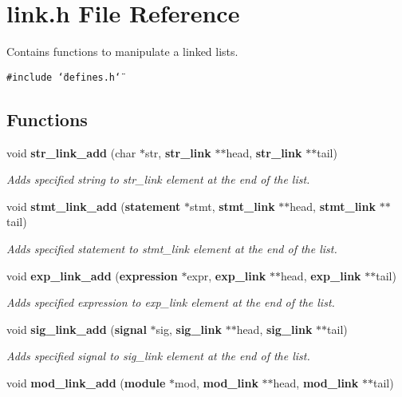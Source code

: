 \section{link.h File Reference}
\label{link_8h}
Contains functions to manipulate a linked lists. 


{\tt \#include \char`\"{}defines.h\char`\"{}}\par
\subsection*{Functions}
\begin{CompactItemize}
\item 
void {\bf str\_\-link\_\-add} (char $\ast$str, {\bf str\_\-link} $\ast$$\ast$head, {\bf str\_\-link} $\ast$$\ast$tail)
\begin{CompactList}\small\item\em Adds specified string to str\_\-link element at the end of the list.\item\end{CompactList}\item 
void {\bf stmt\_\-link\_\-add} ({\bf statement} $\ast$stmt, {\bf stmt\_\-link} $\ast$$\ast$head, {\bf stmt\_\-link} $\ast$$\ast$tail)
\begin{CompactList}\small\item\em Adds specified statement to stmt\_\-link element at the end of the list.\item\end{CompactList}\item 
void {\bf exp\_\-link\_\-add} ({\bf expression} $\ast$expr, {\bf exp\_\-link} $\ast$$\ast$head, {\bf exp\_\-link} $\ast$$\ast$tail)
\begin{CompactList}\small\item\em Adds specified expression to exp\_\-link element at the end of the list.\item\end{CompactList}\item 
void {\bf sig\_\-link\_\-add} ({\bf signal} $\ast$sig, {\bf sig\_\-link} $\ast$$\ast$head, {\bf sig\_\-link} $\ast$$\ast$tail)
\begin{CompactList}\small\item\em Adds specified signal to sig\_\-link element at the end of the list.\item\end{CompactList}\item 
void {\bf mod\_\-link\_\-add} ({\bf module} $\ast$mod, {\bf mod\_\-link} $\ast$$\ast$head, {\bf mod\_\-link} $\ast$$\ast$tail)

\end{CompactItemize}
